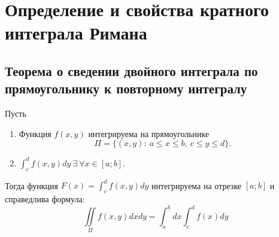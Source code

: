 \section{Определение и свойства кратного интеграла Римана}

\setcounter{subsection}{147}

\subsection{Теорема о сведении двойного интеграла по прямоугольнику к повторному интегралу}

\begin{theorem}
    Пусть
    \begin{enumerate}
        \item Функция $ f(x,y) $ интегрируема на прямоугольнике
              \[
                  \Pi = \big\{(x,y): \ a \leqslant x \leqslant b, \ c \leqslant y \leqslant d\big\}.
              \]

        \item $ \int_{c}^{d}f(x,y)dy \ \exists \ \forall x \in [a;b] $.
    \end{enumerate}

    Тогда функция $ F(x) = \int_{c}^{d}f(x,y)dy $ интегрируема на отрезке $ [a;b] $ и справедлива формула:
    \[
        \boxed{\iint\limits_\Pi f(x,y)dxdy = \int_{a}^{b}dx \int_{c}^{d}f(x)dy}
    \]
\end{theorem}

